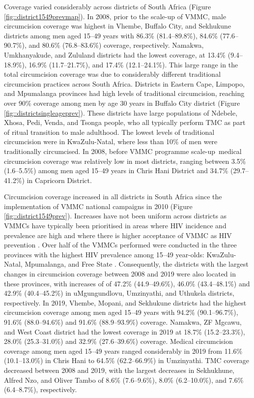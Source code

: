 \documentclass{article}
\begin{document}
Coverage varied considerably across districts of South Africa (Figure \ref{fig::district1549prevmap}). In 2008, prior to the scale-up of VMMC, male circumcision coverage was highest in Vhembe, Buffalo City, and Sekhukune districts among men aged 15--49 years with 86.3\% (81.4--89.8\%), 84.6\% (77.6--90.7\%), and 80.6\% (76.8--83.6\%) coverage, respectively. Namakwa, Umkhanyakude, and Zululand districts had the lowest coverage, at 13.4\% (9.4--18.9\%), 16.9\% (11.7--21.7\%), and 17.4\% (12.1--24.1\%). This large range in the total circumcision coverage was due to considerably different traditional circumcision practices across South Africa. Districts in Eastern Cape, Limpopo, and Mpumalanga provinces had high levels of traditional circumcision, reaching over 90\% coverage among men by age 30 years in Buffalo City district (Figure \ref{fig::districtsingleageprev}). These districts have large populations of Ndebele, Xhosa, Pedi, Venda, and Tsonga people, who all typically perform TMC as part of ritual transition to male adulthood. The lowest levels of traditional circumcision were in KwaZulu-Natal, where less than 10\% of men were traditionally circumcised. In 2008, before VMMC programme scale-up\, medical circumcision coverage was relatively low in most districts, ranging between 3.5\% (1.6--5.5\%) among men aged 15--49 years in Chris Hani District and 34.7\% (29.7--41.2\%) in Capricorn District.

Circumcision coverage increased in all districts in South Africa since the implementation of VMMC national campaigns in 2010 (Figure \ref{fig::district1549prev}). Increases have not been uniform across districts as VMMCs have typically been prioritised in areas where HIV incidence and prevalence are high and where there is higher acceptance of VMMC as HIV prevention \cite{WHOVoluntary2}. Over half of the VMMCs performed were conducted in the three provinces with the highest HIV prevalence among 15--49 year-olds: KwaZulu-Natal, Mpumalanga, and Free State \cite{hivdata}. Consequently, the districts with the largest changes in circumcision coverage between 2008 and 2019 were also located in these provinces, with increases of of 47.2\% (44.9--49.6\%), 46.0\% (43.4--48.1\%) and 42.9\% (40.4--45.2\%) in uMgungundlovu, Umzinyathi, and Uthukela districts, respectively. In 2019, Vhembe, Mopani, and Sekhukune districts had the highest circumcision coverage among men aged 15--49 years with 94.2\% (90.1--96.7\%), 91.6\% (88.0--94.6\%) and 91.6\% (88.9--93.9\%) coverage. Namakwa, ZF Mgcawu, and West Coast district had the lowest coverage in 2019 at 18.7\% (15.2--23.3\%), 28.0\% (25.3--31.0\%) and 32.9\% (27.6--39.6\%) coverage. Medical circumcision coverage among men aged 15--49 years ranged considerably in 2019 from 11.6\% (10.1--13.0\%) in Chris Hani to 64.5\% (62.2--66.9\%) in Umzinyathi. TMC coverage decreased between 2008 and 2019, with the largest decreases in Sekhukhune, Alfred Nzo, and Oliver Tambo of 8.6\% (7.6--9.6\%), 8.0\% (6.2--10.0\%), and 7.6\% (6.4--8.7\%), respectively.
\end{document}
